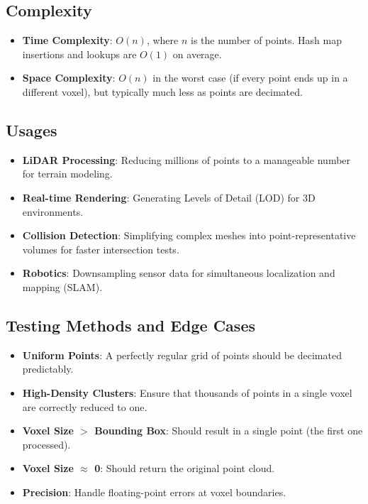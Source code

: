 \subsection{Complexity}
\begin{itemize}
\item \textbf{Time Complexity}: $O(n)$, where $n$ is the number of points. Hash map insertions and lookups are $O(1)$ on average.
\item \textbf{Space Complexity}: $O(n)$ in the worst case (if every point ends up in a different voxel), but typically much less as points are decimated.
\end{itemize}

\subsection{Usages}
\begin{itemize}
\item \textbf{LiDAR Processing}: Reducing millions of points to a manageable number for terrain modeling.
\item \textbf{Real-time Rendering}: Generating Levels of Detail (LOD) for 3D environments.
\item \textbf{Collision Detection}: Simplifying complex meshes into point-representative volumes for faster intersection tests.
\item \textbf{Robotics}: Downsampling sensor data for simultaneous localization and mapping (SLAM).
\end{itemize}

\subsection{Testing Methods and Edge Cases}
\begin{itemize}
\item \textbf{Uniform Points}: A perfectly regular grid of points should be decimated predictably.
\item \textbf{High-Density Clusters}: Ensure that thousands of points in a single voxel are correctly reduced to one.
\item \textbf{Voxel Size $>$ Bounding Box}: Should result in a single point (the first one processed).
\item \textbf{Voxel Size $\approx$ 0}: Should return the original point cloud.
\item \textbf{Precision}: Handle floating-point errors at voxel boundaries.
\end{itemize}


